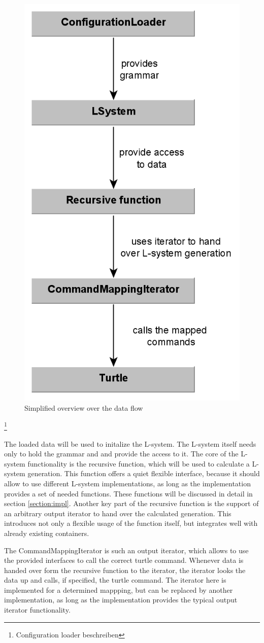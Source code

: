 \documentclass[english]{cpp-hmwk}
\begin{document}
\begin{figure}[h!]
	\centering
	\includegraphics[width=0.4\columnwidth]{../graphs/LSystem/examples/overview.png}
	\caption{Simplified overview over the data flow}
	\label{figure:overview}
\end{figure}

\footnote{Configuration loader beschreiben}

The loaded data will be used to initalize the L-system. The L-system itself needs only to hold the grammar and and provide the access to it. The core of the L-system functionality is the recursive function, which will be used to calculate a L-system generation. This function offers a quiet flexible interface, because it should allow to use different L-system implementations, as long as the implementation provides a set of needed functions. These functions will be discussed in detail in section \ref{section:impl}. 
Another key part of the recursive function is the support of an arbitrary output iterator to hand over the calculated generation. This introduces not only a flexible usage of the function itself, but integrates well with already existing containers. 

The CommandMappingIterator is such an output iterator, which allows to use the provided interfaces to call the correct turtle command. Whenever data is handed over form the recursive function to the iterator, the iterator looks the data up and calls, if specified, the turtle command. The iterator here is  implemented for a determined mappping, but can be replaced by another implementation, as long as the implementation provides the typical output iterator functionality.
\end{document}
